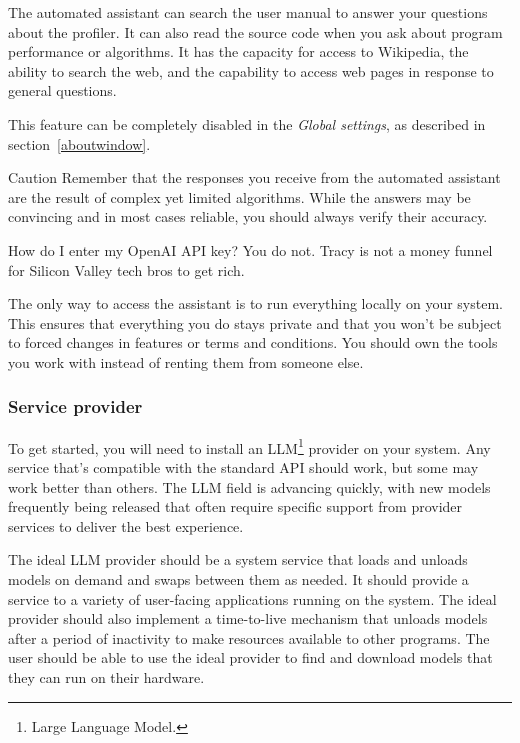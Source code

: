 \documentclass[hidelinks,titlepage,a4paper,twoside]{article}
\begin{document}
The automated assistant can search the user manual to answer your questions about the profiler. It can also read the source code when you ask about program performance or algorithms. It has the capacity for access to Wikipedia, the ability to search the web, and the capability to access web pages in response to general questions.

This feature can be completely disabled in the \emph{Global settings}, as described in section~\ref{aboutwindow}.

\begin{bclogo}[
noborder=true,
couleur=black!5,
logo=\bcattention
]{Caution}
Remember that the responses you receive from the automated assistant are the result of complex yet limited algorithms. While the answers may be convincing and in most cases reliable, you should always verify their accuracy.
\end{bclogo}

\begin{bclogo}[
noborder=true,
couleur=black!5,
logo=\bcquestion
]{How do I enter my OpenAI API key?}
You do not. Tracy is not a money funnel for Silicon Valley tech bros to get rich.

The only way to access the assistant is to run everything locally on your system. This ensures that everything you do stays private and that you won't be subject to forced changes in features or terms and conditions. You should own the tools you work with instead of renting them from someone else.
\end{bclogo}

\subsubsection{Service provider}

To get started, you will need to install an LLM\footnote{Large Language Model.} provider on your system. Any service that's compatible with the standard API should work, but some may work better than others. The LLM field is advancing quickly, with new models frequently being released that often require specific support from provider services to deliver the best experience.

The ideal LLM provider should be a system service that loads and unloads models on demand and swaps between them as needed. It should provide a service to a variety of user-facing applications running on the system. The ideal provider should also implement a time-to-live mechanism that unloads models after a period of inactivity to make resources available to other programs. The user should be able to use the ideal provider to find and download models that they can run on their hardware.
\end{document}
